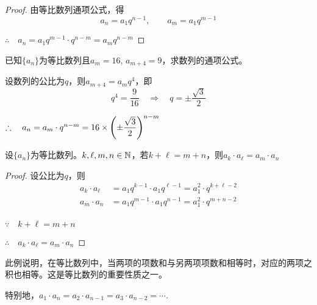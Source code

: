 \begin{proof}
    由等比数列通项公式，得
\[a_n=a_1q^{n-1},\qquad a_m=a_1q^{m-1}\]

$\therefore\quad a_n=a_1q^{m-1}\cdot q^{n-m}=a_m q^{n-m}$
\end{proof}


\begin{example}
    已知$\{a_n\}$为等比数列且$a_m=16$, $a_{m+4}=9$，求数列的通项公式。
\end{example}

\begin{solution}
设数列的公比为$q$，则$a_{m+4}=a_m q^4$，即
\[q^4=\frac{9}{16}\quad \Rightarrow\quad q=\pm\frac{\sqrt{3}}{2}\]

$\therefore\quad a_n=a_m\cdot q^{n-m}=16\times \left(\pm\dfrac{\sqrt{3}}{2}\right)^{n-m}$
\end{solution}


\begin{example}
    设$\{a_n\}$为等比数列。$k,\ell,m,n\in\mathbb{N}$，若$k+\ell=m+n$，则$a_k\cdot a_{\ell}=a_m\cdot a_n$
\end{example}

\begin{proof}
    设公比为$q$，则
\[\begin{split}
    a_{k}\cdot a_{\ell}&=a_1q^{k-1}\cdot a_1q^{\ell-1}=a^2_1\cdot q^{k+\ell-2}\\
    a_{m}\cdot a_{n}&=a_1q^{m-1}\cdot a_1q^{n-1}=a^2_1\cdot q^{m+n-2}\\
\end{split}\]

$\because\quad k+\ell=m+n$

$\therefore\quad a_k\cdot a_{\ell}=a_m\cdot a_n$
\end{proof}

\begin{rmk}
    此例说明，在等比数列中，当两项的项数和与另两项项数和相等时，对应的两项之积也相等。这是等比数列的重要性质之一。

特别地，$a_1\cdot a_n=a_2\cdot a_{n-1}=a_3\cdot a_{n-2}=\cdots$.
\end{rmk}

